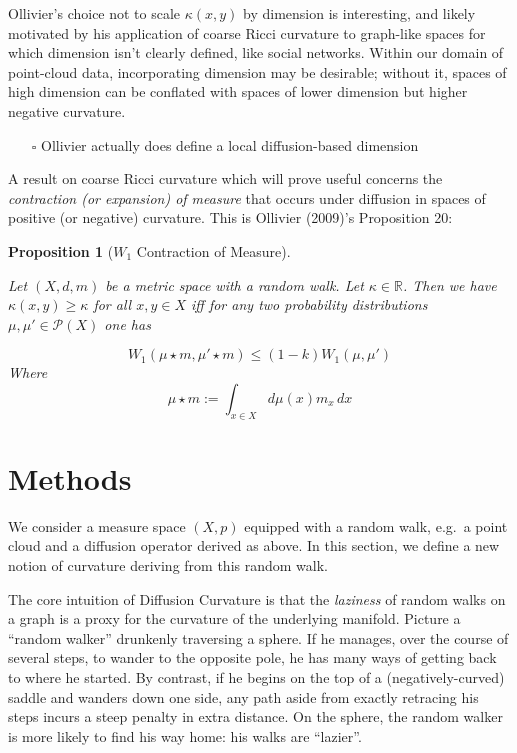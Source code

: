 \documentclass[
  letterpaper,
  DIV=11,
  numbers=noendperiod]{scrartcl}
\providecommand{\tightlist}{%
  \setlength{\itemsep}{0pt}\setlength{\parskip}{0pt}}\usepackage{longtable,booktabs,array}
\theoremstyle{plain}
\theoremstyle{definition}
\theoremstyle{plain}
\theoremstyle{definition}
\theoremstyle{plain}
\newtheorem{proposition}{Proposition}[section]
\theoremstyle{remark}
\begin{document}
Ollivier's choice not to scale \(\kappa(x,y)\) by dimension is
interesting, and likely motivated by his application of coarse Ricci
curvature to graph-like spaces for which dimension isn't clearly
defined, like social networks. Within our domain of point-cloud data,
incorporating dimension may be desirable; without it, spaces of high
dimension can be conflated with spaces of lower dimension but higher
negative curvature.

\begin{itemize}
\tightlist
\item[$\square$]
  Ollivier actually does define a local diffusion-based dimension
\end{itemize}

A result on coarse Ricci curvature which will prove useful concerns the
\emph{contraction (or expansion) of measure} that occurs under diffusion
in spaces of positive (or negative) curvature. This is Ollivier (2009)'s
Proposition 20:

\begin{proposition}[\(W_1\) Contraction of
Measure]\protect\hypertarget{prp-ollivier-contraction-of-measure}{}\label{prp-ollivier-contraction-of-measure}

Let \((X,d,m)\) be a metric space with a random walk. Let
\(\kappa \in \mathbb{R}\). Then we have \(\kappa(x,y) \geq \kappa\) for
all \(x,y \in X\) iff for any two probability distributions
\(\mu, \mu' \in \mathcal{P}(X)\) one has

\[
W_{1}(\mu \star m, \mu' \star m) \leq (1-k)W_{1}(\mu, \mu')
\] Where \[
 \mu \star m := \int_{{x \in X}} d\mu(x)m_{x} \, dx
\]

\end{proposition}

\section{Methods}\label{methods}

We consider a measure space \((X,p)\) equipped with a random walk,
e.g.~a point cloud and a diffusion operator derived as above. In this
section, we define a new notion of curvature deriving from this random
walk.

The core intuition of Diffusion Curvature is that the \emph{laziness} of
random walks on a graph is a proxy for the curvature of the underlying
manifold. Picture a ``random walker'' drunkenly traversing a sphere. If
he manages, over the course of several steps, to wander to the opposite
pole, he has many ways of getting back to where he started. By contrast,
if he begins on the top of a (negatively-curved) saddle and wanders down
one side, any path aside from exactly retracing his steps incurs a steep
penalty in extra distance. On the sphere, the random walker is more
likely to find his way home: his walks are ``lazier''.
\end{document}
